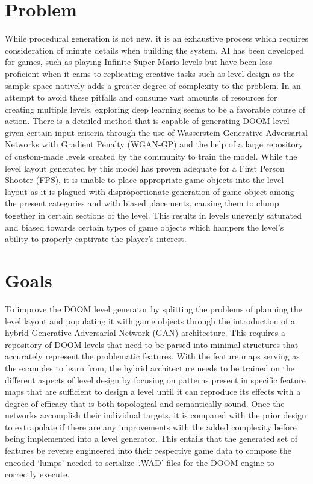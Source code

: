 \documentclass{Configuration_Files/PoliMi3i_thesis}
\begin{document}
\section{Problem}
\label{sec:problem}
While procedural generation is not new, it is an exhaustive process which requires 
consideration of minute details when building the system. AI has been developed for 
games, such as playing Infinite Super Mario levels \cite{KaS12} but have been less proficient when it 
cams to replicating creative tasks such as level design as the sample space natively 
adds a greater degree of complexity to the problem. In an attempt to avoid these 
pitfalls and consume vast amounts of resources for creating multiple levels, 
exploring deep learning seems to be a favorable course of action. There is a detailed 
method that is capable of generating DOOM level given certain input criteria 
through the use of Wasserstein Generative Adversarial Networks with Gradient Penalty 
(WGAN-GP) \cite{MaA17} and the help of a large 
repository of custom-made levels created by the community to train the model. 
While the level layout generated by this model has proven adequate for a  
First Person Shooter (FPS), it is unable to place appropriate game objects into the level layout as it is plagued 
with disproportionate generation of game object among the present categories and with
biased placements, causing them to clump together in certain sections of the 
level. This results in levels unevenly saturated and biased towards certain types of 
game objects which hampers the level’s ability to properly captivate the player’s 
interest.

\section{Goals}
To improve the DOOM level generator by splitting the problems of planning the level 
layout and populating it with game objects through the introduction of a hybrid 
Generative Adversarial Network (GAN) architecture. This requires a repository of DOOM 
levels that need to be parsed into minimal structures that accurately represent the problematic 
features. With the feature maps serving as the examples to learn from, the hybrid architecture needs to be 
trained on the different aspects of level design by focusing on patterns present in specific 
feature maps that are sufficient to design a level until it can reproduce its effects with a degree 
of efficacy that is both topological and semantically sound. Once the networks accomplish their 
individual targets, it is compared with the prior design to extrapolate if there are any improvements with the added 
complexity before being implemented into a level generator. This entails that the generated set of features 
be reverse engineered into their respective game data to compose the encoded ‘lumps’ needed to serialize ‘.WAD’ 
files for the DOOM engine to correctly execute.
\end{document}
